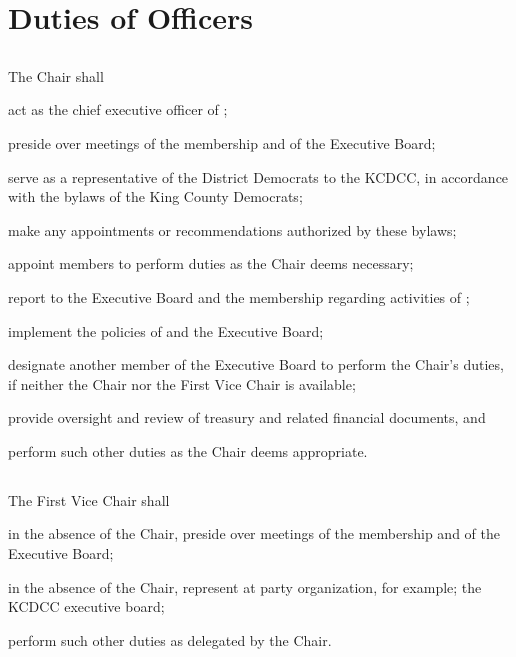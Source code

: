 \section{Duties of Officers}
\subsection{}
The Chair shall
\begin{inlinealphalist}
    \item act as the chief executive officer of \thedistrict{};
    \item preside over meetings of the membership and of the Executive Board;
    \item serve as a representative of the \fortythird{} District Democrats to the KCDCC, in accordance with the bylaws of the King County Democrats;
    \item make any appointments or recommendations authorized by these bylaws;
    \item appoint members to perform duties as the Chair deems necessary;
    \item report to the Executive Board and the membership regarding activities of \thedistrict{};
    \item implement the policies of \thedistrict{} and the Executive Board;
    \item designate another member of the Executive Board to perform the Chair’s duties, if neither the Chair nor the First Vice Chair is available;
    \item provide oversight and review of \thedistrict{} treasury and related financial documents, and
    \item perform such other duties as the Chair deems appropriate.
\end{inlinealphalist}

\subsection{}
The First Vice Chair shall
\begin{inlinealphalist}
    \item in the absence of the Chair, preside over meetings of the membership and of the Executive Board;
    \item in the absence of the Chair, represent \thedistrict{} at party organization, for example; the KCDCC executive board;
    \item perform such other duties as delegated by the Chair.
\end{inlinealphalist}

